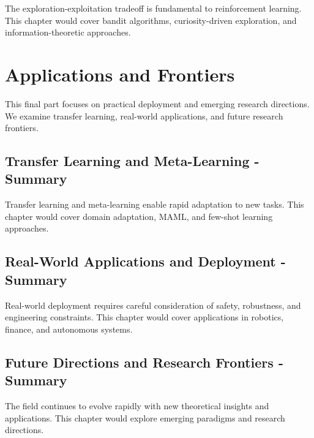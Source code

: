 \documentclass[11pt,twoside,openright]{book}
\begin{document}
\begin{keyideabox}
The exploration-exploitation tradeoff is fundamental to reinforcement learning. This chapter would cover bandit algorithms, curiosity-driven exploration, and information-theoretic approaches.
\end{keyideabox}

\part{Applications and Frontiers}

This final part focuses on practical deployment and emerging research directions. We examine transfer learning, real-world applications, and future research frontiers.

\chapter{Transfer Learning and Meta-Learning - Summary}
\label{ch:transfer-summary}

\begin{keyideabox}
Transfer learning and meta-learning enable rapid adaptation to new tasks. This chapter would cover domain adaptation, MAML, and few-shot learning approaches.
\end{keyideabox}

\chapter{Real-World Applications and Deployment - Summary}
\label{ch:applications-summary}

\begin{keyideabox}
Real-world deployment requires careful consideration of safety, robustness, and engineering constraints. This chapter would cover applications in robotics, finance, and autonomous systems.
\end{keyideabox}

\chapter{Future Directions and Research Frontiers - Summary}
\label{ch:future-summary}

\begin{keyideabox}
The field continues to evolve rapidly with new theoretical insights and applications. This chapter would explore emerging paradigms and research directions.
\end{keyideabox}
\end{document}

